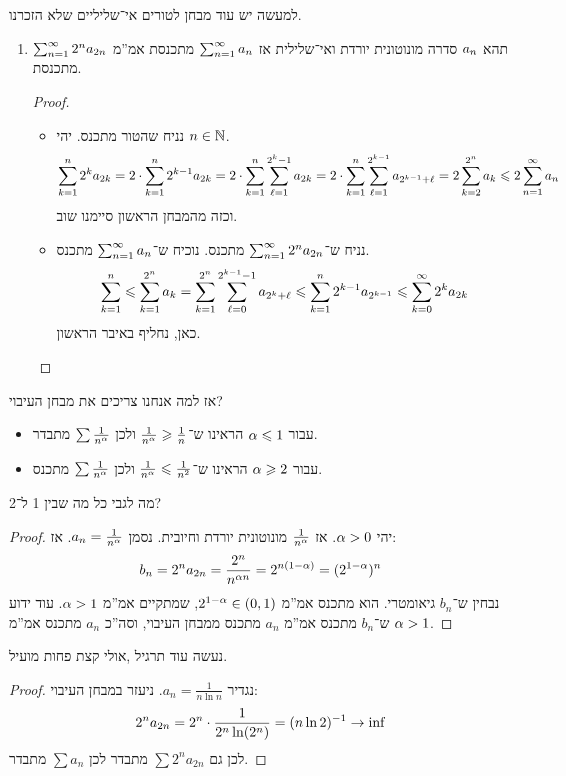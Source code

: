 \documentclass[name=רשימות חשבון דיפרנציאלי ואינטגרלי 1א]{../../../tex/classes/megasumPreamble}
\begin{document}
	למעשה יש עוד מבחן לטורים אי־שליליים שלא הזכרנו.
	\begin{enumerate}
		\item תהא $a_n$ סדרה מונוטונית יורדת ואי־שלילית אז $\sum_{n = 1}^{\infty} a_n$ מתכנסת אמ''מ $\sum_{n = 1}^{\infty} 2^{n}a_{2n}$ מתכנסת.
		\begin{proof}
			\begin{itemize}
				\item[$\implies$]נניח שהטור מתכנס. יהי $n \in \mathbb{N}$.
				\[ \sum_{k = 1}^{n} 2^{k}a_{2k} = 2 \cdot \sum_{k = 1}^{n} 2^{k - 1}a_{2k} = 2 \cdot \sum_{k = 1}^{n} \sum_{\ell = 1}^{2^{k} - 1}a_{2k} = 2 \cdot \sum_{k = 1}^{n} \sum_{\ell = 1}^{2^{k - 1}}a_{2^{k - 1} + \ell} = 2 \sum_{k = 2}^{2^{n}} a_k \leqslant 2 \sum_{n = 1}^{\infty} a_n \]
				וכזה מהמבחן הראשון סיימנו שוב.
				\item[$\impliedby$]נניח ש־$\sum_{n = 1}^{\infty} 2^{n}a_{2n}$ מתכנס. נוכיח ש־$\sum_{n = 1}^{\infty} a_n$ מתכנס.
				\[ \sum_{k = 1}^{n} \leqslant \sum_{k = 1}^{2^{n}}a_k = \sum_{k = 1}^{2^{n}} \sum_{\ell = 0}^{2^{k -1} -1}a_{2^{k} + \ell} \leqslant \sum_{k = 1}^{n} 2^{k - 1}a_{2^{k - 1}} \leqslant \sum_{k = 0}^{\infty} 2^{k}a_{2k} \]
				כאן, נחליף באיבר הראשון.
			\end{itemize}
		\end{proof}
	\end{enumerate}

	אז למה אנחנו צריכים את מבחן העיבוי?
	\begin{itemize}
		\item עבור $\alpha \leqslant 1$ הראינו ש־$\frac{1}{n^{\alpha}} \geqslant \frac{1}{n}$ ולכן $\sum \frac{1}{n^{\alpha}}$ מתבדר.
		\item עבור $\alpha \geqslant 2$ הראינו ש־$\frac{1}{n^{\alpha}} \leqslant \frac{1}{n^{2}}$ ולכן $\sum \frac{1}{n^{\alpha}}$ מתכנס.
	\end{itemize}
	מה לגבי כל מה שבין 1 ל־2?
	\begin{proof}
		יהי $\alpha > 0$. אז $\frac{1}{n^{\alpha}}$ מונוטונית יורדת וחיובית. נסמן $a_n = \frac{1}{n^{\alpha}}$. אז:
		\[ b_n = 2^{n}a_{2n} = \frac{2^{n}}{n^{\alpha n}} = 2^{n(1 - \alpha)} = (2^{1 - \alpha})^{n} \]
		נבחין ש־$b_n$ גיאומטרי. הוא מתכנס אמ''מ $2^{1 - \alpha} \in (0, 1)$, שמתקיים אמ''מ $\alpha > 1$. עוד ידוע ש־$b_n$ מתכנס אמ''מ $a_n$ מתכנס ממבחן העיבוי, וסה''כ $a_n$ מתכנס אמ''מ $\alpha > 1$.
	\end{proof}

	נעשה עוד תרגיל ,אולי קצת פחות מועיל.

	\begin{proof}
		נגדיר $a_n = \frac{1}{n \ln n}$. ניעזר במבחן העיבוי:
		\[ 2^{n}a_{2n} = 2^{n} \cdot \frac{1}{2^{n}\ln (2^{n})} = (n \ln 2)^{-1} \to \inf \]
		לכן גם $\sum 2^{n}a_{2n}$ מתבדר לכן $\sum a_n$ מתבדר.
	\end{proof}
\end{document}
